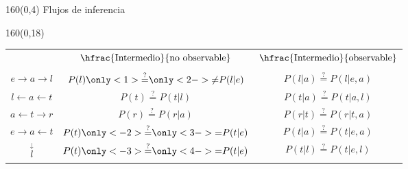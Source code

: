 \documentclass[shownotes,aspectratio=169]{beamer}
\begin{document}
\begin{frame}[plain]
\begin{textblock}{160}(0,4)
\centering \Large Flujos de inferencia
\end{textblock}

\begin{textblock}{160}(0,18)
\centering
 \begin{tabular}{c c|c}
 & $\hfrac{\text{Intermedio}}{\text{no observable}}$ &   $\hfrac{\text{Intermedio}}{\text{observable}}$ \\
 & & \\
 $ e \rightarrow a \rightarrow l $    & $P(l) \only<1>{\overset{?}{=}}\only<2->{\neq} P(l|e)$ & $P(l|a) \overset{?}{=} P(l|e,a)$ \\ 
 $ l \leftarrow a \leftarrow t $      &  $P(t) \overset{?}{=} P(t|l)$  & $P(t|a) \overset{?}{=} P(t|a,l)$ \\ 
 $ a \leftarrow t \rightarrow r $     & $P(r) \overset{?}{=} P(r|a)$ & $P(r|t) \overset{?}{=} P(r|t,a)$ \\
 $ e \rightarrow a \leftarrow t $     & $P(t) \only<-2>{\overset{?}{=}}\only<3->{=} P(t|e)$ & $P(t|a) \overset{?}{=} P(t|e,a)$ \\
            $\overset{\downarrow}{l}$  & $P(t) \only<-3>{\overset{?}{=}}\only<4->{=} P(t|e)$ & $P(t|l) \overset{?}{=} P(t|e,l)$
 \end{tabular} 
 \end{textblock}
 

\end{frame}
\end{document}
